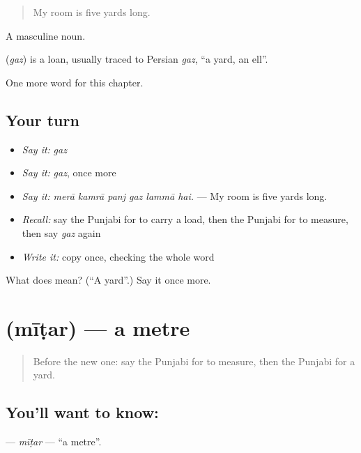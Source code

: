 \begin{quote}
My room is five yards long.
\end{quote}

A masculine noun.

\begin{cousinweb}
\textbf{} (\emph{gaz}) is a loan, usually traced to Persian \emph{gaz}, \textquotedblleft{}a yard, an ell\textquotedblright{}.
\end{cousinweb}

\begin{grammarlens}[title={What you've built}]
One more word for this chapter.
\end{grammarlens}

\subsection*{Your turn}
\begin{itemize}
\raggedright
  \item \emph{Say it:} \emph{gaz}
  \item \emph{Say it:} \emph{gaz}, once more
  \item \emph{Say it:} \emph{merā kamrā panj gaz lammā hai.} — My room is five yards long.
  \item \emph{Recall:} say the Punjabi for to carry a load, then the Punjabi for to measure, then say \emph{gaz} again
  \item \emph{Write it:} copy \textbf{} once, checking the whole word
\end{itemize}

\begin{tcolorbox}[breakable,colback=teal!4,colframe=teal!35!black,title={Before you move on}]
What does  mean? (\textquotedblleft{}A yard\textquotedblright{}.) Say it once more.
\end{tcolorbox}
\section[\texorpdfstring{\pa{ਮੀਟਰ} (mīṭar)}{ਮੀਟਰ (mīṭar)}]{ (mīṭar) — a metre}

\label{lesson:PA-C274-mitar}



\begin{quote}
Before the new one: say the Punjabi for to measure, then the Punjabi for a yard.
\end{quote}

\subsection*{You'll want to know: }
\textbf{} — \emph{mīṭar} — \textquotedblleft{}a metre\textquotedblright{}.


